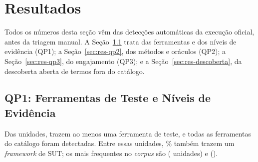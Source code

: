 \documentclass[sigconf]{acmart}
\begin{document}
\section{Resultados}
\label{sec:resultados}

Todos os números desta seção vêm das detecções automáticas da execução oficial, antes da triagem manual. A Seção~\ref{sec:res-qp1} trata das ferramentas e dos níveis de evidência (QP1); a Seção~\ref{sec:res-qp2}, dos métodos e oráculos (QP2); a Seção~\ref{sec:res-qp3}, do engajamento (QP3); e a Seção~\ref{sec:res-descoberta}, da descoberta aberta de termos fora do catálogo.

\subsection{QP1: Ferramentas de Teste e Níveis de Evidência}
\label{sec:res-qp1}

Das \ResUnidades{} unidades, \ResUnidadesComFerramenta{} trazem ao menos uma ferramenta de teste, e todas as \ResFerramentasDetectadas{} ferramentas do catálogo foram detectadas. Entre essas unidades, \ResPctUnidadesComFw\% também trazem um \textit{framework} de SUT; os mais frequentes no \textit{corpus} são \ResFwTop{} (\ResFwTopN{} unidades) e \ResFwSegundo{} (\ResFwSegundoN).
\end{document}
